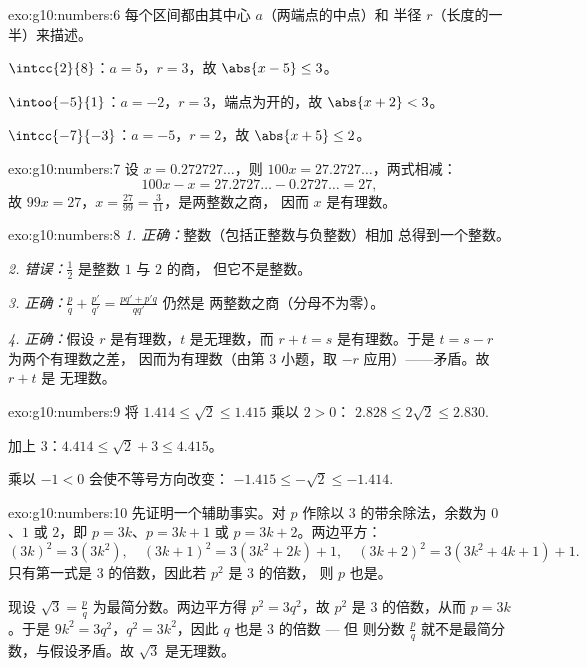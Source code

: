 \begin{solution}{exo:g10:numbers:6}
每个区间都由其中心 $a$（两端点的中点）和
半径 $r$（长度的一半）来描述。

$\intcc{2}{8}$：$a = 5$，$r = 3$，故 $\abs{x - 5} \leq 3$。

$\intoo{-5}{1}$：$a = -2$，$r = 3$，端点为开的，故 $\abs{x + 2} < 3$。

$\intcc{-7}{-3}$：$a = -5$，$r = 2$，故 $\abs{x + 5} \leq 2$。
\end{solution}

\begin{solution}{exo:g10:numbers:7}
设 $x = 0.272727\dots$，则 $100x = 27.2727\dots$，两式相减：
\[
100x - x = 27.2727\dots - 0.2727\dots = 27,
\]
故 $99x = 27$，$x = \frac{27}{99} = \frac{3}{11}$，是两整数之商，
因而 $x$ 是有理数。
\end{solution}

\begin{solution}{exo:g10:numbers:8}
\emph{1. 正确：}整数（包括正整数与负整数）相加
总得到一个整数。

\emph{2. 错误：}$\frac{1}{2}$ 是整数 $1$ 与 $2$ 的商，
但它不是整数。

\emph{3. 正确：}$\frac pq + \frac{p'}{q'} = \frac{pq' + p'q}{qq'}$ 仍然是
两整数之商（分母不为零）。

\emph{4. 正确：}假设 $r$ 是有理数，$t$ 是无理数，而 $r + t = s$
是有理数。于是 $t = s - r$ 为两个有理数之差，
因而为有理数（由第 3 小题，取 $-r$ 应用）——矛盾。故 $r + t$ 是
无理数。
\end{solution}

\begin{solution}{exo:g10:numbers:9}
将 $1.414 \leq \sqrt2 \leq 1.415$ 乘以 $2 > 0$：
$2.828 \leq 2\sqrt2 \leq 2.830$.

加上 $3$：$4.414 \leq \sqrt2 + 3 \leq 4.415$。

乘以 $-1 < 0$ 会使不等号方向改变：
$-1.415 \leq -\sqrt2 \leq -1.414$.
\end{solution}

\begin{solution}{exo:g10:numbers:10}
先证明一个辅助事实。对 $p$ 作除以 $3$ 的带余除法，余数为 $0$、$1$ 或
$2$，即 $p = 3k$、$p = 3k+1$ 或 $p = 3k+2$。两边平方：
\[
(3k)^2 = 3(3k^2), \quad
(3k+1)^2 = 3(3k^2 + 2k) + 1, \quad
(3k+2)^2 = 3(3k^2 + 4k + 1) + 1 .
\]
只有第一式是 $3$ 的倍数，因此若 $p^2$ 是 $3$ 的倍数，
则 $p$ 也是。

现设 $\sqrt3 = \frac pq$ 为最简分数。两边平方得
$p^2 = 3q^2$，故 $p^2$ 是 $3$ 的倍数，从而 $p = 3k$。于是
$9k^2 = 3q^2$，$q^2 = 3k^2$，因此 $q$ 也是 $3$ 的倍数 --- 但
则分数 $\frac pq$ 就不是最简分数，与假设矛盾。故
$\sqrt3$ 是无理数。
\end{solution}

